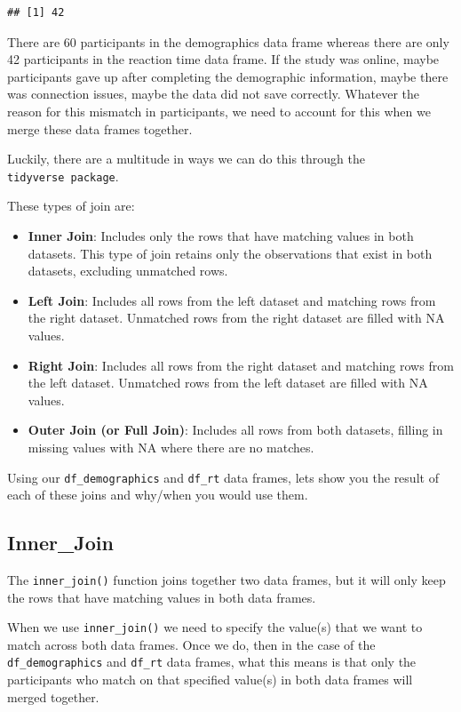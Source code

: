 \documentclass[
]{book}
\begin{document}
\begin{verbatim}
## [1] 42
\end{verbatim}

There are 60 participants in the demographics data frame whereas there are only 42 participants in the reaction time data frame. If the study was online, maybe participants gave up after completing the demographic information, maybe there was connection issues, maybe the data did not save correctly. Whatever the reason for this mismatch in participants, we need to account for this when we merge these data frames together.

Luckily, there are a multitude in ways we can do this through the \texttt{tidyverse\ package}.

These types of join are:

\begin{itemize}
\item
  \textbf{Inner Join}: Includes only the rows that have matching values in both datasets. This type of join retains only the observations that exist in both datasets, excluding unmatched rows.
\item
  \textbf{Left Join}: Includes all rows from the left dataset and matching rows from the right dataset. Unmatched rows from the right dataset are filled with NA values.
\item
  \textbf{Right Join}: Includes all rows from the right dataset and matching rows from the left dataset. Unmatched rows from the left dataset are filled with NA values.
\item
  \textbf{Outer Join (or Full Join)}: Includes all rows from both datasets, filling in missing values with NA where there are no matches.
\end{itemize}

Using our \texttt{df\_demographics} and \texttt{df\_rt} data frames, lets show you the result of each of these joins and why/when you would use them.

\hypertarget{inner_join}{%
\subsection{Inner\_Join}\label{inner_join}}

The \texttt{inner\_join()} function joins together two data frames, but it will only keep the rows that have matching values in both data frames.

When we use \texttt{inner\_join()} we need to specify the value(s) that we want to match across both data frames. Once we do, then in the case of the \texttt{df\_demographics} and \texttt{df\_rt} data frames, what this means is that only the participants who match on that specified value(s) in both data frames will merged together.
\end{document}
